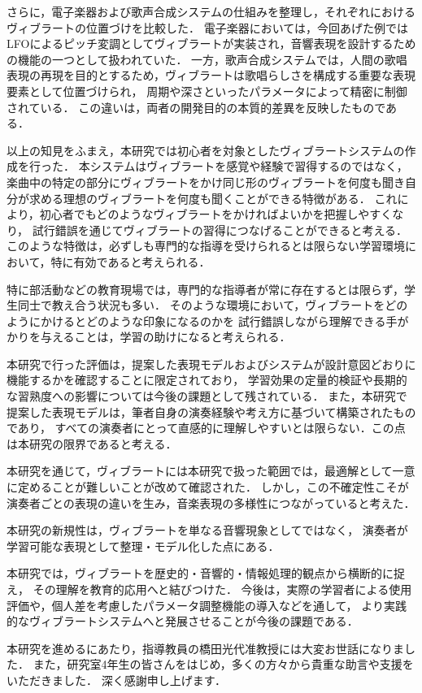 さらに，電子楽器および歌声合成システムの仕組みを整理し，それぞれにおけるヴィブラートの位置づけを比較した．
電子楽器においては，今回あげた例ではLFOによるピッチ変調としてヴィブラートが実装され，音響表現を設計するための機能の一つとして扱われていた．
一方，歌声合成システムでは，人間の歌唱表現の再現を目的とするため，ヴィブラートは歌唱らしさを構成する重要な表現要素として位置づけられ，
周期や深さといったパラメータによって精密に制御されている．
この違いは，両者の開発目的の本質的差異を反映したものである．

以上の知見をふまえ，本研究では初心者を対象としたヴィブラートシステムの作成を行った．
本システムはヴィブラートを感覚や経験で習得するのではなく，
楽曲中の特定の部分にヴィブラートをかけ同じ形のヴィブラートを何度も聞き自分が求める理想のヴィブラートを何度も聞くことができる特徴がある．
これにより，初心者でもどのようなヴィブラートをかければよいかを把握しやすくなり，
試行錯誤を通じてヴィブラートの習得につなげることができると考える．
このような特徴は，必ずしも専門的な指導を受けられるとは限らない学習環境において，特に有効であると考えられる．

特に部活動などの教育現場では，専門的な指導者が常に存在するとは限らず，学生同士で教え合う状況も多い．
そのような環境において，ヴィブラートをどのようにかけるとどのような印象になるのかを
試行錯誤しながら理解できる手がかりを与えることは，学習の助けになると考えられる．

本研究で行った評価は，提案した表現モデルおよびシステムが設計意図どおりに機能するかを確認することに限定されており，
学習効果の定量的検証や長期的な習熟度への影響については今後の課題として残されている．
また，本研究で提案した表現モデルは，筆者自身の演奏経験や考え方に基づいて構築されたものであり，
すべての演奏者にとって直感的に理解しやすいとは限らない．この点は本研究の限界であると考える．

本研究を通じて，ヴィブラートには本研究で扱った範囲では，最適解として一意に定めることが難しいことが改めて確認された．
しかし，この不確定性こそが演奏者ごとの表現の違いを生み，音楽表現の多様性につながっていると考えた．

本研究の新規性は，ヴィブラートを単なる音響現象としてではなく，
演奏者が学習可能な表現として整理・モデル化した点にある．

本研究では，ヴィブラートを歴史的・音響的・情報処理的観点から横断的に捉え，
その理解を教育的応用へと結びつけた．
今後は，実際の学習者による使用評価や，個人差を考慮したパラメータ調整機能の導入などを通して，
より実践的なヴィブラートシステムへと発展させることが今後の課題である．


\begin{acknowledgment}
	本研究を進めるにあたり，指導教員の橋田光代准教授には大変お世話になりました．
	また，研究室4年生の皆さんをはじめ，多くの方々から貴重な助言や支援をいただきました．
	深く感謝申し上げます．
\end{acknowledgment}

